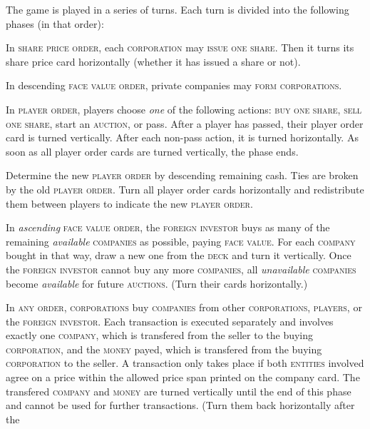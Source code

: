 \documentclass[8pt]{extarticle}
\newcounter{itemcounter}
\newenvironment{my_enumerate}
{\begin{list}{\arabic{itemcounter}.}
  {\usecounter{itemcounter}\leftmargin=1.8em}
  \setlength{\itemsep}{1pt}
  \setlength{\parskip}{0pt}
  \setlength{\parsep}{0pt}
}
{\end{list}}
\begin{document}
\begin{small}
\begin{multicols}{2}
{The game is played in a series of turns. Each turn is divided into the
following phases (in that order):

\begin{my_enumerate}
\item In \textsc{share price order}, each \textsc{corporation}
  may \textsc{issue one share}. Then it turns its share price card
  horizontally (whether it has issued a share or not).
\item In descending \textsc{face value order}, private companies may
  \textsc{form corporations}.
\item In \textsc{player order}, players choose \emph{one} of the
  following actions: \textsc{buy one share}, \textsc{sell one share},
  start an \textsc{auction}, or pass. After a player has passed, their
  player order card is turned vertically. After each non-pass action,
  it is turned horizontally. As soon as all player order cards are
  turned vertically, the phase ends.
\item Determine the new \textsc{player order} by descending remaining
  cash. Ties are broken by the old \textsc{player order}. Turn all
  player order cards horizontally and redistribute them between
  players to indicate the new \textsc{player order}.
\item In \emph{ascending} \textsc{face value order}, the
  \textsc{foreign investor} buys as many of the remaining
  \emph{available} \textsc{companies} as possible, paying \textsc{face
    value}. For each \textsc{company} bought in that way, draw a new
  one from the \textsc{deck} and turn it vertically. Once the
  \textsc{foreign investor} cannot buy any more \textsc{companies},
  all \emph{unavailable} \textsc{companies} become \emph{available}
  for future \textsc{auctions}. (Turn their cards horizontally.)
\item In \textsc{any order}, \textsc{corporations} buy
  \textsc{companies} from other \textsc{corporations},
  \textsc{players}, or the \textsc{foreign investor}. Each transaction
  is executed separately and involves exactly one \textsc{company},
  which is transfered from the seller to the buying
  \textsc{corporation}, and the \textsc{money} payed, which is
  transfered from the buying \textsc{corporation} to the seller. A
  transaction only takes place if both \textsc{entities} involved
  agree on a price within the allowed price span printed on the
  company card. The transfered \textsc{company} and \textsc{money}
  are turned vertically until the end of this phase and cannot be used
  for further transactions. (Turn them back horizontally after the

\end{my_enumerate}}
\end{multicols}
\end{small}
\end{document}
